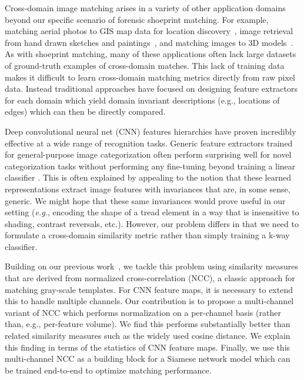 \documentclass[twocolumn]{svjour3}           %
\newcommand{\eg}{\emph{e.g.}}
\begin{document}
Cross-domain image matching arises in a variety of other application domains
beyond our specific scenario of forensic shoeprint matching.  For example,
matching aerial photos to GIS map data for location
discovery~\cite{SenletICPR2014,CosteaBMVC2016,DivechaSIGSPATIAL16}, image
retrieval from hand drawn sketches and
paintings~\cite{ChenetalSketch2Photo2009,ShrivastavaCrossDomain2011},
and matching images to 3D models~\cite{RusselAlignment2011}.
As with shoeprint matching, many of these
applications often lack large datasets of ground-truth examples of cross-domain
matches. This lack of training data makes it difficult to learn cross-domain
matching metrics directly from raw pixel data.  Instead traditional approaches
have focused on designing feature extractors for each domain which yield domain
invariant descriptions (e.g., locations of edges) which can then be directly
compared.

Deep convolutional neural net (CNN) features hierarchies have proven incredibly
effective at a wide range of recognition tasks. Generic feature extractors
trained for general-purpose image categorization often perform surprising well
for novel categorization tasks without performing any fine-tuning beyond
training a linear classifier \cite{sharif2014cnn}.  This is
often explained by appealing to the notion that these learned representations
extract image features with invariances that are, in some sense, generic.  We
might hope that these same invariances would prove useful in our setting (\eg,
encoding the shape of a tread element in a way that is insensitive to shading,
contrast reversals, etc.). However, our problem differs in that we need to
formulate a cross-domain similarity metric rather than simply training a k-way
classifier. 

Building on our previous work~\cite{KongSRF_BMVC_2017},
we tackle this problem using similarity measures that are derived from normalized
cross-correlation (NCC), a classic approach for matching gray-scale templates.
For CNN feature maps, it is necessary to extend this to handle multiple channels. 
Our contribution is to propose a multi-channel variant of NCC which performs
normalization on a per-channel basis (rather than, e.g., per-feature volume).
We find this performs substantially better than related similarity measures
such as the widely used cosine distance. We explain this finding in terms of
the statistics of CNN feature maps. Finally, we use this multi-channel NCC as a
building block for a Siamese network model which can be trained end-to-end to
optimize matching performance.
\end{document}
